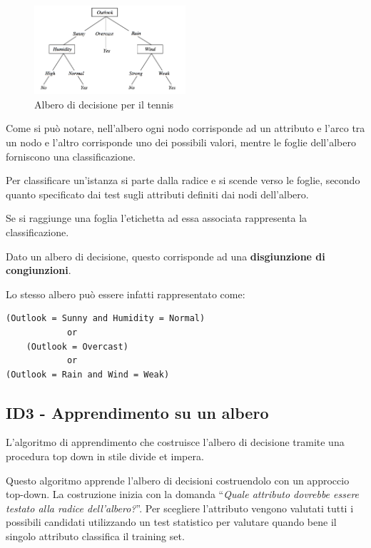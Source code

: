 \begin{figure}[htbp]
\centering
\includegraphics[width=0.5\textwidth]{./notes/immagini/l7-albero.png}
\caption{Albero di decisione per il tennis}
\end{figure}
\FloatBarrier

Come si può notare, nell'albero ogni nodo corrisponde ad un attributo e
l'arco tra un nodo e l'altro corrisponde uno dei possibili valori,
mentre le foglie dell'albero forniscono una classificazione.

Per classificare un'istanza si parte dalla radice e si scende verso le
foglie, secondo quanto specificato dai test sugli attributi definiti dai
nodi dell'albero.

Se si raggiunge una foglia l'etichetta ad essa associata rappresenta la
classificazione.

Dato un albero di decisione, questo corrisponde ad una
\textbf{disgiunzione di congiunzioni}.

Lo stesso albero può essere infatti rappresentato come:

\begin{verbatim}
(Outlook = Sunny and Humidity = Normal) 
            or 
    (Outlook = Overcast)
            or
(Outlook = Rain and Wind = Weak) 
\end{verbatim}

\subsection{ID3 - Apprendimento su un albero}\label{id3---apprendimento-su-un-albero}

L'algoritmo di apprendimento che costruisce l'albero di decisione
tramite una procedura top down in stile divide et impera.

Questo algoritmo apprende l'albero di decisioni costruendolo con un
approccio top-down. La costruzione inizia con la domanda ``\emph{Quale
attributo dovrebbe essere testato alla radice dell'albero?}''. Per
scegliere l'attributo vengono valutati tutti i possibili candidati
utilizzando un test statistico per valutare quando bene il singolo
attributo classifica il training set.


